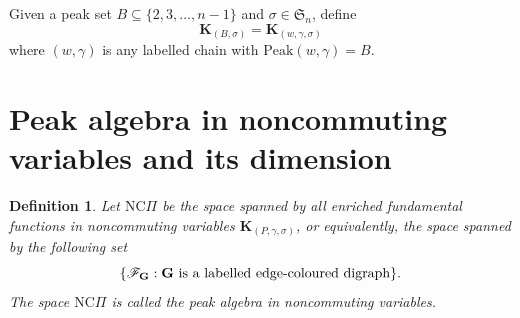 \documentclass[11pt]{amsart}
\newtheorem{Definition}[Theorem]{Definition}
\numberwithin{equation}{section}
\newcommand{\SetComp}{\mathrm{SetComp}}
\newcommand{\peak}{\mathrm{Peak}}
\newcommand{\NCPeak}{\mathrm{NC}\Pi}
\newcommand{\Des}{\mathrm{Des}}
\newcommand{\scrF}{{\mathscr{F}}}
\newcommand{\bfK}{{\mathbf{K}}}
\begin{document}
%
%
%
%
%	
%

Given a peak set $B\subseteq\{2,3,\dots,n-1\}$ and $\sigma\in\mathfrak{S}_n$, define  $$\mathbf{K}_{(B,\sigma)}=\mathbf{K}_{(w,\gamma,\sigma)}$$ where $(w,\gamma)$ is any labelled chain with $\peak(w,\gamma)=B$.\\



\section{Peak algebra in noncommuting variables and its dimension}\label{sec:peak-n}


	
\begin{Definition}\label{Def:NCPeak}
	Let $\NCPeak$ be the space spanned by all enriched fundamental functions in noncommuting variables $\bfK_{(P,\gamma,\sigma)}$, or equivalently, the space spanned by the following set 
	$$\{\scrF_{\bf G}: {\bf G} \text{~is a labelled edge-coloured digraph}\}.$$
	The space $\NCPeak$ is called the \emph{peak algebra in noncommuting variables}.
	\end{Definition} 
\end{document}

